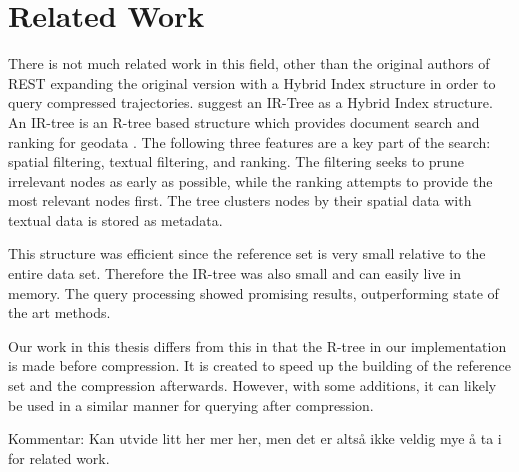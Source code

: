 \chapter{Related Work}
\label{chap:rel}
There is not much related work in this field, other than the original authors of REST expanding the original version with a Hybrid Index structure in order to query compressed trajectories. \textcite{zheng2019reference} suggest an IR-Tree as a Hybrid Index structure. An IR-tree is an R-tree based structure which provides document search and ranking for geodata \cite{li2010ir}. The following three features are a key part of the search: spatial filtering, textual filtering, and ranking. The filtering seeks to prune irrelevant nodes as early as possible, while the ranking attempts to provide the most relevant nodes first. The tree clusters nodes by their spatial data with textual data is stored as metadata.

This structure was efficient since the reference set is very small relative to the entire data set. Therefore the IR-tree was also small and can easily live in memory. The query processing showed promising results, outperforming state of the art methods.

Our work in this thesis differs from this in that the R-tree in our implementation is made before compression. It is created to speed up the building of the reference set and the compression afterwards. However, with some additions, it can likely be used in a similar manner for querying after compression.

Kommentar: Kan utvide litt her mer her, men det er altså ikke veldig mye å ta i for related work.